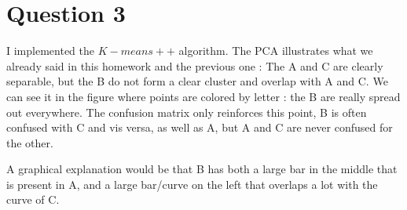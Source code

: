 \documentclass{article}
\begin{document}
\section{Question 3}

I implemented the $K-means++$ algorithm. The PCA illustrates what we already said in this homework and the previous one : The A and C are clearly separable, but the B do not form a clear cluster and overlap with A and C. We can see it in the figure where points are colored by letter : the B are really spread out everywhere. The confusion matrix only reinforces this point, B is often confused with C and vis versa, as well as A, but A and C are never confused for the other.

A graphical explanation would be that B has both a large bar in the middle that is present in A, and a large bar/curve on the left that overlaps a lot with the curve of C.
\end{document}
